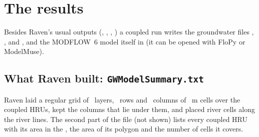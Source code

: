 \section{The results}
Besides Raven's usual outputs (, , , ) a
coupled run writes the groundwater files , ,  and
, and the MODFLOW~6 model itself in  (it can be opened with FloPy or ModelMuse).

\subsection{What Raven built: \texttt{GWModelSummary.txt}}
Raven laid a regular grid of ~layers, ~rows and ~columns of ~m cells over the
 coupled HRUs, kept the  columns that lie under them, and placed  river cells
along the river lines. The second part of the file (not shown) lists every coupled HRU with its area in the , the
area of its polygon and the number of cells it covers.

